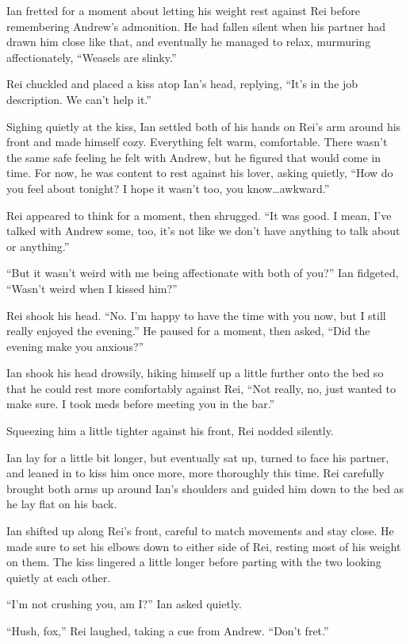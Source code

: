 Ian fretted for a moment about letting his weight rest against Rei before remembering Andrew's admonition. He had fallen silent when his partner had drawn him close like that, and eventually he managed to relax, murmuring affectionately, ``Weasels are slinky.''

Rei chuckled and placed a kiss atop Ian's head, replying, ``It's in the job description. We can't help it.''

Sighing quietly at the kiss, Ian settled both of his hands on Rei's arm around his front and made himself cozy. Everything felt warm, comfortable. There wasn't the same safe feeling he felt with Andrew, but he figured that would come in time. For now, he was content to rest against his lover, asking quietly, ``How do you feel about tonight? I hope it wasn't too, you know\ldots{}awkward.''

Rei appeared to think for a moment, then shrugged. ``It was good. I mean, I've talked with Andrew some, too, it's not like we don't have anything to talk about or anything.''

``But it wasn't weird with me being affectionate with both of you?'' Ian fidgeted, ``Wasn't weird when I kissed him?''

Rei shook his head. ``No. I'm happy to have the time with you now, but I still really enjoyed the evening.'' He paused for a moment, then asked, ``Did the evening make you anxious?''

Ian shook his head drowsily, hiking himself up a little further onto the bed so that he could rest more comfortably against Rei, ``Not really, no, just wanted to make sure. I took meds before meeting you in the bar.''

Squeezing him a little tighter against his front, Rei nodded silently.

Ian lay for a little bit longer, but eventually sat up, turned to face his partner, and leaned in to kiss him once more, more thoroughly this time. Rei carefully brought both arms up around Ian's shoulders and guided him down to the bed as he lay flat on his back.

Ian shifted up along Rei's front, careful to match movements and stay close. He made sure to set his elbows down to either side of Rei, resting most of his weight on them. The kiss lingered a little longer before parting with the two looking quietly at each other.

``I'm not crushing you, am I?'' Ian asked quietly.

``Hush, fox,'' Rei laughed, taking a cue from Andrew. ``Don't fret.''

